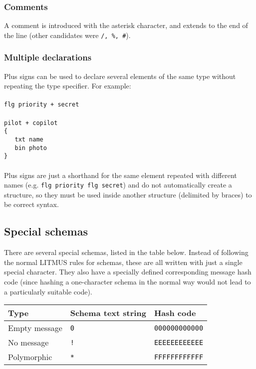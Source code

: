 \documentclass[12pt,a4paper,twoside]{article}
\renewcommand{\_}{\texttt{\symbol{95}}}
\begin{document}
\subsubsection*{Comments}

A comment is introduced with the asterisk character, and extends
to the end of the line (other candidates were \verb^/, %, #^).

\subsubsection*{Multiple declarations}

Plus signs can be used to declare several elements of the same
type without repeating the type specifier. For example:\\
\\
\verb^flg priority + secret^\\
\\
\verb^pilot + copilot^\\
\verb^{^\\
\verb^   txt name^\\
\verb^   bin photo^\\
\verb^}^\\
\\
Plus signs are just a shorthand for the same element repeated with
different names (e.g. \verb^flg priority flg secret^) and do not
automatically create a structure, so they must be used inside another
structure (delimited by braces) to be correct syntax.

\subsection{Special schemas}

There are several special schemas, listed in the table below.
Instead of following the normal LITMUS rules for schemas, these
are all written with just a single special character. They also
have a specially defined corresponding message hash code
(since hashing a one-character schema in the normal way would
not lead to a particularly suitable code).

\begin{center}
\begin{tabular}{|lll|}
\hline
Type & Schema text string & Hash code \rule[-2mm]{0mm}{6.5mm}\\
\hline
Empty message & \verb^0^ & \verb^000000000000^ \rule[0mm]{0mm}{4.5mm}\\
No message    & \verb^!^ & \verb^EEEEEEEEEEEE^\\
Polymorphic   & \verb^*^ & \verb^FFFFFFFFFFFF^ \rule[-2mm]{0mm}{2mm}\\
\hline
\end{tabular}
\end{center}
\end{document}
